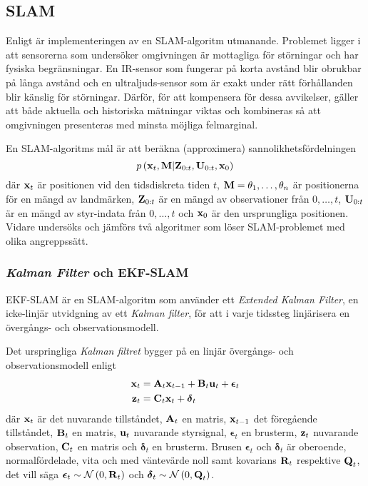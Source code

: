 \documentclass[11pt]{article}
\newcommand{\bfr}[1]{\textbf{\textrm{{#1}}}}
\begin{document}
\begin{flushleft}
\subsection{SLAM}
\label{slam}
Enligt \cite{ekf} är implementeringen av en SLAM-algoritm utmanande. Problemet ligger i att sensorerna som undersöker omgivningen är mottagliga för störningar och har fysiska begränsningar. En IR-sensor som fungerar på korta avstånd blir obrukbar på långa avstånd och en ultraljuds-sensor som är exakt under rätt förhållanden blir känslig för störningar. Därför, för att kompensera för dessa avvikelser, gäller att både aktuella och historiska mätningar viktas och kombineras så att omgivningen presenteras med minsta möjliga felmarginal. 

En SLAM-algoritms mål är att beräkna (approximera) sannolikhetsfördelningen
\begin{equation*}
	p\left(\textbf{\textrm{x}}_{t},\textbf{\textrm{M}} \vert \textbf{\textrm{Z}}_{0:t}, \textbf{\textrm{U}}_{0:t}, \textbf{\textrm{x}}_0 \right)
\end{equation*}
där $\textbf{\textrm{x}}_t$ är positionen vid den tidsdiskreta tiden $t$, $\textbf{\textrm{M}}=\theta_1,\ldots,\theta_n$ är positionerna för en mängd av landmärken, $\textbf{\textrm{Z}}_{0:t}$ är en mängd av observationer från $0,\ldots,t$, $\textbf{\textrm{U}}_{0:t}$ är en mängd av styr-indata från $0,\ldots,t$ och $\textbf{\textrm{x}}_0$ är den ursprungliga positionen. Vidare undersöks och jämförs två algoritmer som löser SLAM-problemet med olika angreppssätt.   

\subsubsection{\emph{Kalman Filter} och EKF-SLAM}
EKF-SLAM är en SLAM-algoritm som använder ett \emph{Extended Kalman Filter}, en icke-linjär utvidgning av ett \emph{Kalman filter}, för att i varje tidssteg  linjärisera en övergångs- och observationsmodell.

Det urspringliga \emph{Kalman filtret} bygger på en linjär övergångs- och observationsmodell enligt
\begin{align*}
	\bfr{x}_t &= \bfr{A}_{t}\bfr{x}_{t-1} + \bfr{B}_{t}\bfr{u}_t + \boldsymbol{\epsilon}_t \\
	\bfr{z}_t &= \bfr{C}_{t}\bfr{x}_t + \boldsymbol{\delta}_t
\end{align*}
där $\bfr{x}_t$ är det nuvarande tillståndet, $\bfr{A}_t$ en matris, $\bfr{x}_{t-1}$ det föregående tillståndet, $\bfr{B}_t$ en matris, $\bfr{u}_t$ nuvarande styrsignal, $\boldsymbol{\epsilon}_t$ en brusterm, $\bfr{z}_t$ nuvarande observation, $\bfr{C}_t$ en matris och $\boldsymbol{\delta}_t$ en brusterm. Brusen $\boldsymbol{\epsilon}_t$ och $\boldsymbol{\delta}_t$ är oberoende, normalfördelade, vita och  med väntevärde noll samt kovarians $\bfr{R}_t$ respektive $\bfr{Q}_t$, det vill säga $\boldsymbol{\epsilon}_t \sim \mathcal{N}\left(0,\bfr{R}_t\right)$ och $\boldsymbol{\delta}_t \sim \mathcal{N}\left(0,\bfr{Q}_t\right)$.


\end{flushleft}
\end{document}
